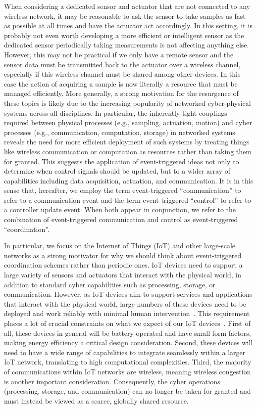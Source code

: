 \documentclass{autart}
\begin{document}
When considering a dedicated sensor and actuator that are not
connected to any wireless network, it may be reasonable to ask the
sensor to take samples as fast as possible at all times and have the
actuator act accordingly. In this setting, it is probably not even
worth developing a more efficient or intelligent sensor as the
dedicated sensor periodically taking measurements is not affecting
anything else. However, this may not be practical if we only have a
remote sensor and the sensor data must be transmitted back to the
actuator over a wireless channel, especially if this wireless channel
must be shared among other devices.  In this case the action of
acquiring a sample is now literally a resource that must be managed
efficiently.  More generally, a strong motivation for the resurgence
of these topics is likely due to the increasing popularity of
networked cyber-physical systems across all disciplines. In
particular, the inherently tight couplings required between physical
processes (e.g., sampling, actuation, motion) and cyber processes
(e.g., communication, computation, storage) in networked systems
reveals the need for more efficient deployment of such systems by
treating things like wireless communication or computation as
resources rather than taking them for granted. This suggests the
application of event-triggered ideas not only to determine when
control signals should be updated, but to a wider array of
capabilities including data acquisition, actuation, and communication.
{It is in this sense that, hereafter, we employ the term
  event-triggered ``communication'' to refer to a communication event
  and the term event-triggered ``control'' to refer to a controller
  update event. When both appear in conjunction, we refer to the
  combination of event-triggered communication and control as
  event-triggered ``coordination''.}

In particular, we focus on the Internet of Things (IoT) and other
large-scale networks as a strong motivator for why we should think
about event-triggered coordination schemes rather than periodic ones.
IoT devices need to support a large variety of sensors and actuators
that interact with the physical world, in addition to standard cyber
capabilities such as processing, storage, or communication.  However,
as IoT devices aim to support services and applications that interact
with the physical world,  large numbers of these devices need to
be deployed and work reliably with minimal human
intervention~\citep{CP-CHL-SJ-MC:14}. This requirement places a lot of
crucial constraints on what we expect of our IoT
devices~\citep{PK-CP-GE-MP:16}. First of all, these devices in general
will be battery-operated and have small form factors, making energy
efficiency a critical design consideration. Second, these devices will
need to have a wide range of capabilities to integrate seamlessly
within a larger IoT network, translating to high computational
complexities. Third, the majority of communications within IoT
networks are wireless, meaning wireless congestion is another
important consideration. Consequently, the cyber operations
(processing, storage, and communication) can no longer be taken for
granted and must instead be viewed as a scarce, globally shared
resource.
\end{document}
